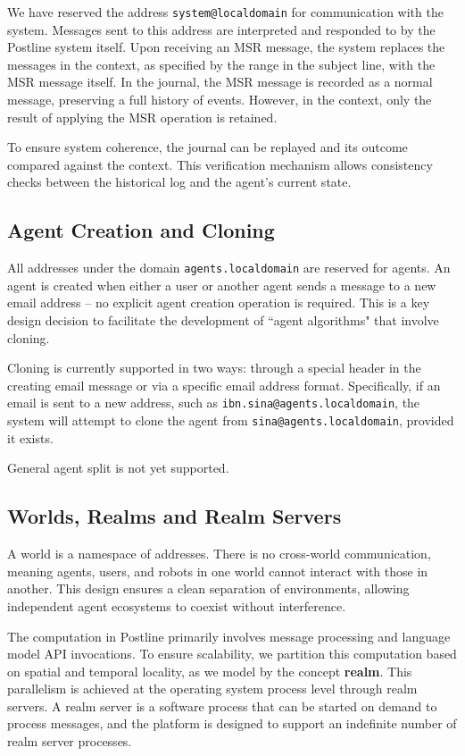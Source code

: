 We have reserved the address \texttt{system@localdomain} for communication with the system. Messages sent to this address are interpreted and responded to by the Postline system itself.
Upon receiving an MSR message, the system replaces the messages in the context, as specified by the range in the subject line, with the MSR message itself. In the journal, the MSR message is recorded as a normal message, preserving a full history of events. However, in the context, only the result of applying the MSR operation is retained.

To ensure system coherence, the journal can be replayed and its outcome compared against the context. This verification mechanism allows consistency checks between the historical log and the agent’s current state.

\subsection{Agent Creation and Cloning}

All addresses under the domain \texttt{agents.localdomain} are reserved for agents.
An agent is created when either a user or another agent sends a message to a new email address -- no explicit agent creation operation is required. This is a key design decision to facilitate the development of ``agent algorithms" that involve cloning.

Cloning is currently supported in two ways: through a special header in the creating email message or via a specific email address format. Specifically, if an email is sent to a new address, such as \texttt{ibn.sina@agents.localdomain}, the system will attempt to clone the agent from \texttt{sina@agents.localdomain}, provided it exists.

General agent split is not yet supported.

\subsection{Worlds, Realms and Realm Servers}

A world is a namespace of addresses. There is no cross-world communication, meaning agents, users, and robots in one world cannot interact with those in another. This design ensures a clean separation of environments, allowing independent agent ecosystems to coexist without interference.


The computation in Postline primarily involves message processing and language model API invocations. To ensure scalability, we partition this computation based on spatial and temporal locality, as we model by the concept {\bf realm}. This parallelism is achieved at the operating system process level through realm servers. A realm server is a software process that can be started on demand to process messages, and the platform is designed to support an indefinite number of realm server processes.

